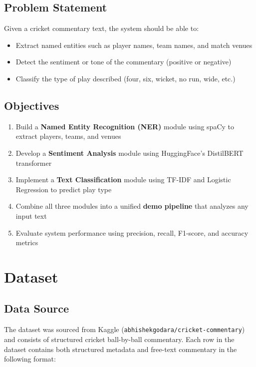 \documentclass[12pt,a4paper]{article}
\begin{document}
\subsection{Problem Statement}

Given a cricket commentary text, the system should be able to:
\begin{itemize}[leftmargin=1.5em]
  \item Extract named entities such as player names, team names, and match venues
  \item Detect the sentiment or tone of the commentary (positive or negative)
  \item Classify the type of play described (four, six, wicket, no run, wide, etc.)
\end{itemize}

\subsection{Objectives}

\begin{enumerate}[leftmargin=1.5em]
  \item Build a \textbf{Named Entity Recognition (NER)} module using spaCy to extract players, teams, and venues
  \item Develop a \textbf{Sentiment Analysis} module using HuggingFace's DistilBERT transformer
  \item Implement a \textbf{Text Classification} module using TF-IDF and Logistic Regression to predict play type
  \item Combine all three modules into a unified \textbf{demo pipeline} that analyzes any input text
  \item Evaluate system performance using precision, recall, F1-score, and accuracy metrics
\end{enumerate}

\section{Dataset}

\subsection{Data Source}

The dataset was sourced from Kaggle (\texttt{abhishekgodara/cricket-commentary}) and consists of structured cricket ball-by-ball commentary. Each row in the dataset contains both structured metadata and free-text commentary in the following format:
\end{document}
